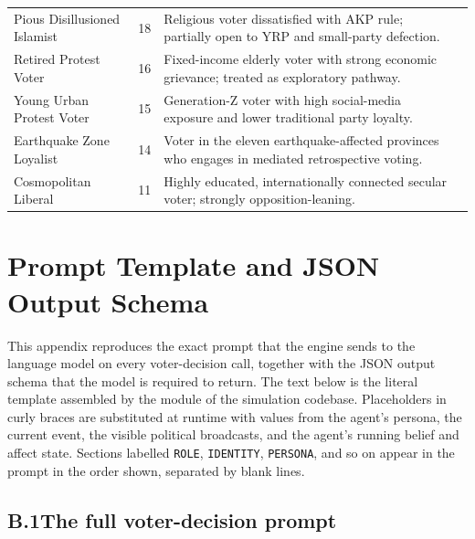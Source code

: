 \documentclass[12pt,a4paper]{report}
\begin{document}
\begin{landscape}
\begin{longtable}{@{}p{3.5cm}p{1.5cm}p{10cm}p{4.5cm}@{}}
Pious Disillusioned Islamist & 18 & Religious voter dissatisfied with AKP rule; partially open to YRP and small-party defection. & \citet{carkoglu2024unlikely,cinkara2025erdogan} \\
Retired Protest Voter & 16 & Fixed-income elderly voter with strong economic grievance; treated as exploratory pathway. & \citet{carkoglu2024unlikely,yildirim2025sege} \\
Young Urban Protest Voter & 15 & Generation-Z voter with high social-media exposure and lower traditional party loyalty. & \citet{hafizoglu2021z,karaca2024socialmedia,aytac2025polarised} \\
Earthquake Zone Loyalist & 14 & Voter in the eleven earthquake-affected provinces who engages in mediated retrospective voting. & \citet{sevinc2024afet,carkoglu2024unlikely} \\
Cosmopolitan Liberal & 11 & Highly educated, internationally connected secular voter; strongly opposition-leaning. & \citet{aytac2025polarised,ozbudun2013cleavages} \\
\bottomrule
\end{longtable}
\normalsize
\end{landscape}

\chapter{Prompt Template and JSON Output Schema}
\label{app:prompt_schema}

This appendix reproduces the exact prompt that the engine sends to the language model on every voter-decision call, together with the JSON output schema that the model is required to return. The text below is the literal template assembled by the  module of the simulation codebase. Placeholders in curly braces are substituted at runtime with values from the agent's persona, the current event, the visible political broadcasts, and the agent's running belief and affect state. Sections labelled \texttt{ROLE}, \texttt{IDENTITY}, \texttt{PERSONA}, and so on appear in the prompt in the order shown, separated by blank lines.

\section*{B.1\quad The full voter-decision prompt}
\end{document}

